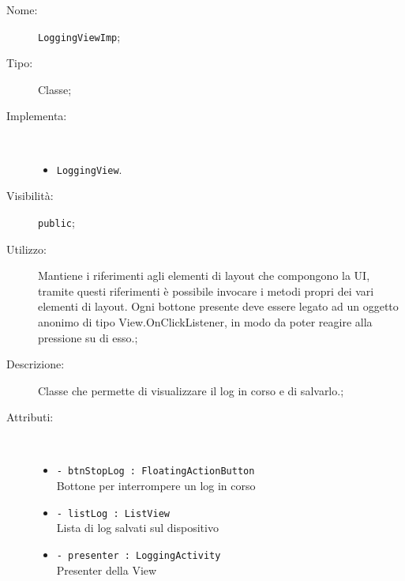 \documentclass[../DefinizioneDiProdotto.tex]{subfiles}
\begin{document}
\begin{description}
	\item[Nome:] \texttt{LoggingViewImp};
	\item[Tipo:] Classe;
	\item[Implementa:] \
	\begin{itemize}
		\item \texttt{LoggingView}.
		
	\end{itemize}
	\item[Visibilità:] \texttt{public};
	\item[Utilizzo:] Mantiene i riferimenti agli elementi di layout che compongono la UI, tramite questi riferimenti è possibile invocare i metodi propri dei vari elementi di layout. Ogni bottone presente deve essere legato ad un oggetto anonimo di tipo View.OnClickListener, in modo da poter reagire alla pressione su di esso.;
	\item[Descrizione:] Classe che permette di visualizzare il log in corso e di salvarlo.;
	\item[Attributi:] \
	\begin{itemize}
		\item \texttt{- btnStopLog : FloatingActionButton}\\
		Bottone per interrompere un log in corso 
		
		\item \texttt{- listLog : ListView}\\
		Lista di log salvati sul dispositivo
		
		\item \texttt{- presenter : LoggingActivity}\\
		Presenter della View
		

\end{itemize}
\end{description}
\end{document}
